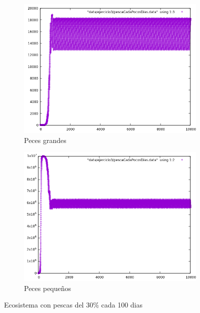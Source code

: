 \documentclass[12pt,a4paper]{article}
\begin{document}
\begin{figure}[H]
	\centering
	\begin{subfigure}{.5\textwidth}
		\centering
		\includegraphics[width=1\linewidth]{./images/pescaGrandePocosDias.png}
		\caption{Peces grandes}
		\label{fig:subPecesGrandes4}
	\end{subfigure}%
	\begin{subfigure}{.5\textwidth}
		\centering
		\includegraphics[width=1\linewidth]{./images/pescaPequePocosDias.png}
		\caption{Peces pequeños}
		\label{fig:subPecesPeque4}
	\end{subfigure}
	\caption{Ecosistema con pescas del 30\% cada 100 dias}
	\label{fig:ecosistema4}
\end{figure}
\end{document}
